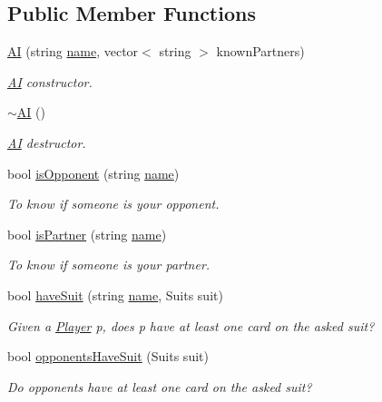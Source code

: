\subsection*{\-Public \-Member \-Functions}
\begin{DoxyCompactItemize}
\item 
\hyperlink{classAI_a66d6cd98eca679d4f2e53d8e07d70231}{\-A\-I} (string \hyperlink{classPlayer_acf0355128a99ee20ad9931b760fb2de1}{name}, vector$<$ string $>$ known\-Partners)
\begin{DoxyCompactList}\small\item\em \hyperlink{classAI}{\-A\-I} constructor. \end{DoxyCompactList}\item 
\hyperlink{classAI_a66a8645f0c27285cd75346f2c2bbfb14}{$\sim$\-A\-I} ()
\begin{DoxyCompactList}\small\item\em \hyperlink{classAI}{\-A\-I} destructor. \end{DoxyCompactList}\item 
bool \hyperlink{classAI_a4b7197635ffe4d2496b367c38c19cef4}{is\-Opponent} (string \hyperlink{classPlayer_acf0355128a99ee20ad9931b760fb2de1}{name})
\begin{DoxyCompactList}\small\item\em \-To know if someone is your opponent. \end{DoxyCompactList}\item 
bool \hyperlink{classAI_a6527528ecab508fa4bf99f80ee0efa50}{is\-Partner} (string \hyperlink{classPlayer_acf0355128a99ee20ad9931b760fb2de1}{name})
\begin{DoxyCompactList}\small\item\em \-To know if someone is your partner. \end{DoxyCompactList}\item 
bool \hyperlink{classAI_a6f39142d5c4b2dab8b053fcc0fbe9ab4}{have\-Suit} (string \hyperlink{classPlayer_acf0355128a99ee20ad9931b760fb2de1}{name}, \-Suits suit)
\begin{DoxyCompactList}\small\item\em \-Given a \hyperlink{classPlayer}{\-Player} p, does p have at least one card on the asked suit? \end{DoxyCompactList}\item 
bool \hyperlink{classAI_a7203308d46eca68cc9b77b804857037d}{opponents\-Have\-Suit} (\-Suits suit)
\begin{DoxyCompactList}\small\item\em \-Do opponents have at least one card on the asked suit? \end{DoxyCompactList}\item 

\end{DoxyCompactItemize}
